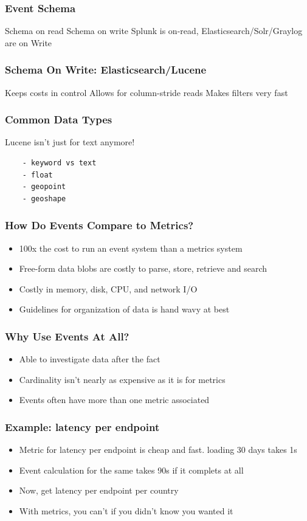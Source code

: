 \begin{frame}[fragile]
    \frametitle{Event Schema}

    Schema on read Schema on write
    Splunk is on-read, Elasticsearch/Solr/Graylog are on Write

\end{frame}

\begin{frame}[fragile]
    \frametitle{Schema On Write: Elasticsearch/Lucene}
    Keeps costs in control
    Allows for column-stride reads
    Makes filters very fast
\end{frame}
\begin{frame}[fragile]
    \frametitle{Common Data Types}
    Lucene isn't just for text anymore!
    \begin{lstlisting}
    - keyword vs text
    - float
    - geopoint
    - geoshape
    \end{lstlisting}
\end{frame}

\begin{frame}
    \frametitle{How Do Events Compare to Metrics?}
    \begin{itemize}
      \item 100x the cost to run an event system than a metrics system
      \item Free-form data blobs are costly to parse, store, retrieve and search
      \item Costly in memory, disk, CPU, and network I/O
      \item Guidelines for organization of data is hand wavy at best
    \end{itemize}
\end{frame}

\begin{frame}
    \frametitle{Why Use Events At All?}
    \begin{itemize}
      \item Able to investigate data after the fact
      \item Cardinality isn't nearly as expensive as it is for metrics
      \item Events often have more than one metric associated
    \end{itemize}
\end{frame}

\begin{frame}
    \frametitle{Example: latency per endpoint}
    \begin{itemize}
      \item Metric for latency per endpoint is cheap and fast. loading 30 days takes 1s
      \item Event calculation for the same takes 90s if it complets at all
      \item Now, get latency per endpoint per country
      \item With metrics, you can't if you didn't know you wanted it
    \end{itemize}
\end{frame}



